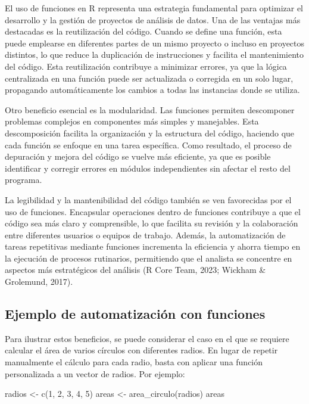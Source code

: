 \documentclass[
  spanish,
  a4paper,
  DIV=11,
  numbers=noendperiod,
  onepage,
  openany]{scrreprt}
\newenvironment{Shaded}{\begin{snugshade}}{\end{snugshade}}
\newcommand{\DecValTok}[1]{\textcolor[rgb]{0.68,0.00,0.00}{#1}}
\newcommand{\FunctionTok}[1]{\textcolor[rgb]{0.28,0.35,0.67}{#1}}
\newcommand{\NormalTok}[1]{\textcolor[rgb]{0.00,0.23,0.31}{#1}}
\newcommand{\OtherTok}[1]{\textcolor[rgb]{0.00,0.23,0.31}{#1}}
\begin{document}
El uso de funciones en R representa una estrategia fundamental para
optimizar el desarrollo y la gestión de proyectos de análisis de datos.
Una de las ventajas más destacadas es la reutilización del código.
Cuando se define una función, esta puede emplearse en diferentes partes
de un mismo proyecto o incluso en proyectos distintos, lo que reduce la
duplicación de instrucciones y facilita el mantenimiento del código.
Esta reutilización contribuye a minimizar errores, ya que la lógica
centralizada en una función puede ser actualizada o corregida en un solo
lugar, propagando automáticamente los cambios a todas las instancias
donde se utiliza.

Otro beneficio esencial es la modularidad. Las funciones permiten
descomponer problemas complejos en componentes más simples y manejables.
Esta descomposición facilita la organización y la estructura del código,
haciendo que cada función se enfoque en una tarea específica. Como
resultado, el proceso de depuración y mejora del código se vuelve más
eficiente, ya que es posible identificar y corregir errores en módulos
independientes sin afectar el resto del programa.

La legibilidad y la mantenibilidad del código también se ven favorecidas
por el uso de funciones. Encapsular operaciones dentro de funciones
contribuye a que el código sea más claro y comprensible, lo que facilita
su revisión y la colaboración entre diferentes usuarios o equipos de
trabajo. Además, la automatización de tareas repetitivas mediante
funciones incrementa la eficiencia y ahorra tiempo en la ejecución de
procesos rutinarios, permitiendo que el analista se concentre en
aspectos más estratégicos del análisis (R Core Team, 2023; Wickham \&
Grolemund, 2017).

\subsection{Ejemplo de automatización con
funciones}\label{ejemplo-de-automatizaciuxf3n-con-funciones}

Para ilustrar estos beneficios, se puede considerar el caso en el que se
requiere calcular el área de varios círculos con diferentes radios. En
lugar de repetir manualmente el cálculo para cada radio, basta con
aplicar una función personalizada a un vector de radios. Por ejemplo:

\begin{Shaded}
\begin{Highlighting}[]
\NormalTok{radios }\OtherTok{\textless{}{-}} \FunctionTok{c}\NormalTok{(}\DecValTok{1}\NormalTok{, }\DecValTok{2}\NormalTok{, }\DecValTok{3}\NormalTok{, }\DecValTok{4}\NormalTok{, }\DecValTok{5}\NormalTok{)}
\NormalTok{areas }\OtherTok{\textless{}{-}} \FunctionTok{area\_circulo}\NormalTok{(radios)}
\NormalTok{areas  }
\end{Highlighting}
\end{Shaded}
\end{document}
